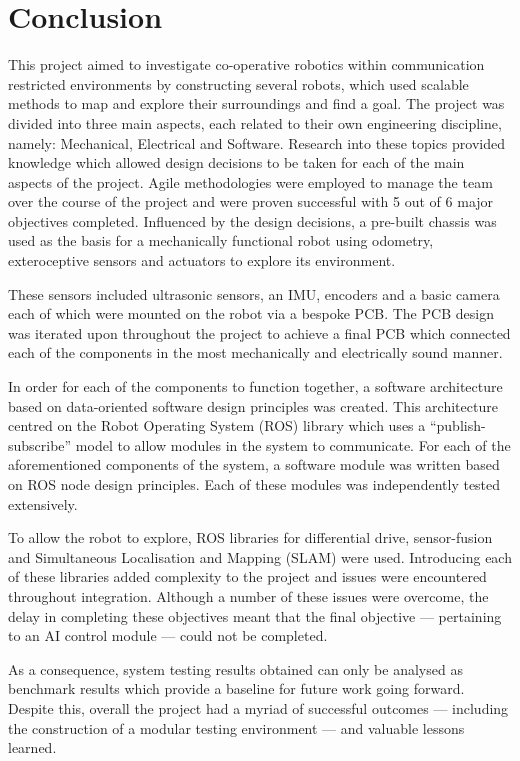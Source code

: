 
\chapter{Conclusion}\label{conclusion}
This project aimed to investigate co-operative robotics within 
communication restricted environments by constructing several robots, 
which used scalable methods to map and explore their surroundings and find 
a goal. The project was divided into three main aspects, each related to 
their own engineering discipline, namely: Mechanical, Electrical and 
Software. Research into these topics provided knowledge which allowed 
design decisions to be taken for each of the main aspects of the project. 
Agile methodologies were employed to manage the team over the course of 
the project and were proven successful with 5 out of 6 major objectives 
completed. Influenced by the design decisions, a pre-built chassis was 
used as the basis for a mechanically functional robot using odometry, 
exteroceptive sensors and actuators to explore its environment. 

These sensors included ultrasonic sensors, an IMU, encoders and a basic 
camera each of which were mounted on the robot via a bespoke PCB. The PCB 
design was iterated upon throughout the project to achieve a final PCB 
which connected each of the components in the most mechanically and 
electrically sound manner. 

In order for each of the components to function together, a software 
architecture based on data-oriented software design principles was 
created. This architecture centred on the Robot Operating System (ROS) 
library which uses a ``publish-subscribe'' model to allow modules in the 
system to communicate. For each of the aforementioned components of the 
system, a software module was written based on ROS node design principles. 
Each of these modules was independently tested extensively. 

To allow the robot to explore, ROS libraries for differential drive, 
sensor-fusion and Simultaneous Localisation and Mapping (SLAM) were used. 
Introducing each of these libraries added complexity to the project and 
issues were encountered throughout integration. Although a number of these 
issues were overcome, the delay in completing these objectives meant that 
the final objective --- pertaining to an AI control module --- could not 
be completed. 

As a consequence, system testing results obtained can only be analysed as 
benchmark results which provide a baseline for future work going forward. 
Despite this, overall the project had a myriad of successful outcomes --- including 
the construction of a modular testing environment --- and 
valuable lessons learned.      
